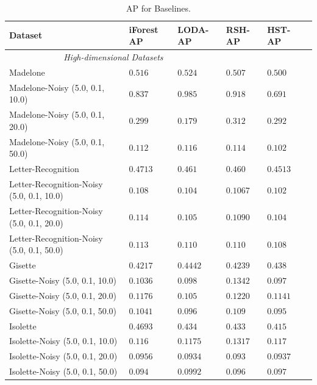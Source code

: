 \begin{table}[ht!]
    \centering
		\begin{tabular}{llllll}
				\toprule
				\textbf{Dataset} & \textbf{iForest AP} &  \textbf{LODA-AP} & \textbf{RSH-AP} &  \textbf{HST-AP} \\
				\midrule
				\multicolumn{3}{c}{\textit{High-dimensional Datasets}}\\
				Madelone & $0.516 $ & $0.524$ & $0.507$ & $0.500$\\
				Madelone-Noisy (5.0, 0.1, 10.0) & $0.837$ & $0.985$ & $0.918$ & $0.691$	\\
				Madelone-Noisy (5.0, 0.1, 20.0) & $0.299$ & $0.179$ & $0.312$ & $0.292$	 \\
				Madelone-Noisy (5.0, 0.1, 50.0) & $0.112$ & $0.116$ & $0.114$ & $0.102$	\\
				\midrule
				Letter-Recognition & $0.4713$ & $0.461$ & $0.460$ & $0.4513$	\\
				Letter-Recognition-Noisy (5.0, 0.1, 10.0) & $0.108$ & $0.104$ & $0.1067$ & $0.102$	\\
				Letter-Recognition-Noisy (5.0, 0.1, 20.0) & $0.114$ & $0.105$ & $0.1090$ & $0.104$	\\
				Letter-Recognition-Noisy (5.0, 0.1, 50.0) & $0.113$ & $0.110$ & $0.110$ & $0.108$	\\
				\midrule
				Gisette & $0.4217$ & $0.4442$ & $0.4239$ & $0.438$	\\
				Gisette-Noisy (5.0, 0.1, 10.0) & $0.1036$ & $0.098$  & $0.1342$ & $0.097$	\\
				Gisette-Noisy (5.0, 0.1, 20.0) & $0.1176$ & $0.105$ & $0.1220$ & $0.1141$	\\
				Gisette-Noisy (5.0, 0.1, 50.0) & $0.1041$ & $0.096$ & $0.109$ & $0.095$	\\
				\midrule
				Isolette & $0.4693$ & $0.434$ & $0.433$ & $0.415$	\\
				Isolette-Noisy (5.0, 0.1, 10.0) & $0.116$ & $0.1175$ & $0.1317$ & $0.117$	\\
				Isolette-Noisy (5.0, 0.1, 20.0) & $0.0956$ & $0.0934$ & $0.093$ & $0.0937$	\\
				Isolette-Noisy (5.0, 0.1, 50.0) & $0.094$ & $0.0992$ & $0.096$ & $0.097$	\\
				\bottomrule
		\end{tabular}
		\caption{AP for Baselines.}
\end{table}

